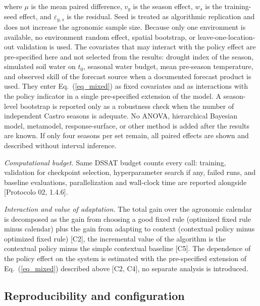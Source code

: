 \documentclass[times,final,authoryear]{elsarticle}
\begin{document}
where $\mu$ is the mean paired difference, $v_y$ is the season effect, $w_s$ is the training-seed effect, and $\varepsilon_{y,s}$ is the residual. Seed is treated as algorithmic replication and does not increase the agronomic sample size. Because only one environment is available, no environment random effect, spatial bootstrap, or leave-one-location-out validation is used. The covariates that may interact with the policy effect are pre-specified here and not selected from the results: drought index of the season, simulated soil water on $t_0$, seasonal water budget, mean pre-season temperature, and observed skill of the forecast source when a documented forecast product is used. They enter Eq.~(\ref{eq_mixed}) as fixed covariates and as interactions with the policy indicator in a single pre-specified extension of the model. A season-level bootstrap is reported only as a robustness check when the number of independent Castro seasons is adequate. No ANOVA, hierarchical Bayesian model, metamodel, response-surface, or other method is added after the results are known. If only four seasons per set remain, all paired effects are shown and described without interval inference.

\emph{Computational budget.} Same DSSAT budget counts every call: training, validation for checkpoint selection, hyperparameter search if any, failed runs, and baseline evaluations, parallelization and wall-clock time are reported alongside [Protocolo 02, 1.4.6].

\emph{Interaction and value of adaptation.} The total gain over the agronomic calendar is decomposed as the gain from choosing a good fixed rule (optimized fixed rule minus calendar) plus the gain from adapting to context (contextual policy minus optimized fixed rule) [C2], the incremental value of the algorithm is the contextual policy minus the simple contextual baseline [C5]. The dependence of the policy effect on the system is estimated with the pre-specified extension of Eq.~(\ref{eq_mixed}) described above [C2, C4], no separate analysis is introduced.


\subsection{Reproducibility and configuration}
\label{subrepro}
\end{document}
